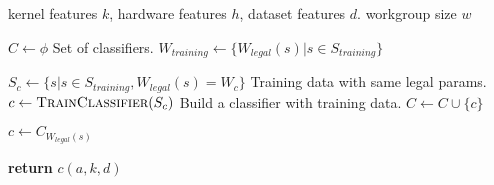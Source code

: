 \begin{algorithmic}[1]
\Require kernel features $k$, hardware features $h$, dataset features
$d$.
\Ensure workgroup size $w$

\State $C \leftarrow \phi$
\Comment Set of classifiers.
\State $W_{training} \leftarrow \{ W_{legal}(s) | s \in S_{training}
\}$

  \State $S_c \leftarrow \{ s | s \in S_{training}, W_{legal}(s) = W_c
  \}$
  \Comment Training data with same legal params.
  \State $c \leftarrow \text{\sc{TrainClassifier}}(S_c)$
  \Comment Build a classifier with training data.
  \State $C \leftarrow C \cup \{ c \}$
\EndFor

\State $c \leftarrow C_{W_{legal}(s)}$

\State \textbf{return} $c(a, k, d)$
\end{algorithmic}
